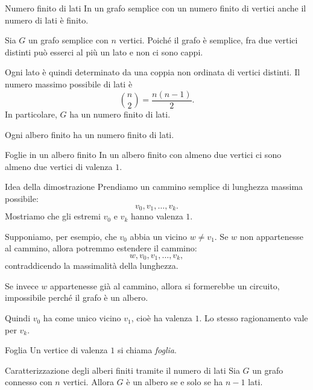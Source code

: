 \documentclass[a4paper]{article}
\begin{document}
\begin{snippetproposition}{Numero finito di lati}
    In un grafo semplice con un numero finito di vertici anche il numero di lati è finito.
\end{snippetproposition}

\begin{snippetproof}{}
    Sia \(G\) un grafo semplice con \(n\) vertici. Poiché il grafo è semplice, fra due vertici distinti può esserci al più un lato e non ci sono cappi.

    Ogni lato è quindi determinato da una coppia non ordinata di vertici distinti. Il numero massimo possibile di lati è
    \[
        \binom{n}{2}=\frac{n(n-1)}{2}.
    \]
    In particolare, \(G\) ha un numero finito di lati.
\end{snippetproof}

\begin{snippetcorollary}{}
    Ogni albero finito ha un numero finito di lati.
\end{snippetcorollary}

\begin{snippetproposition}{Foglie in un albero finito}
    In un albero finito con almeno due vertici ci sono almeno due vertici di valenza \(1\).
\end{snippetproposition}

\begin{snippetproof}{Idea della dimostrazione}
    Prendiamo un cammino semplice di lunghezza massima possibile:
    \[
        v_0,v_1,\ldots,v_k.
    \]
    Mostriamo che gli estremi \(v_0\) e \(v_k\) hanno valenza \(1\).

    Supponiamo, per esempio, che \(v_0\) abbia un vicino \(w\neq v_1\). Se \(w\) non appartenesse al cammino, allora potremmo estendere il cammino:
    \[
        w,v_0,v_1,\ldots,v_k,
    \]
    contraddicendo la massimalità della lunghezza.

    Se invece \(w\) appartenesse già al cammino, allora si formerebbe un circuito, impossibile perché il grafo è un albero.

    Quindi \(v_0\) ha come unico vicino \(v_1\), cioè ha valenza \(1\). Lo stesso ragionamento vale per \(v_k\).
\end{snippetproof}

\begin{snippetdefinition}{Foglia}
    Un vertice di valenza \(1\) si chiama \emph{foglia}.
\end{snippetdefinition}

\begin{snippettheorem}{Caratterizzazione degli alberi finiti tramite il numero di lati}
    Sia \(G\) un grafo connesso con \(n\) vertici. Allora \(G\) è un albero se e solo se ha \(n-1\) lati.
\end{snippettheorem}
\end{document}
